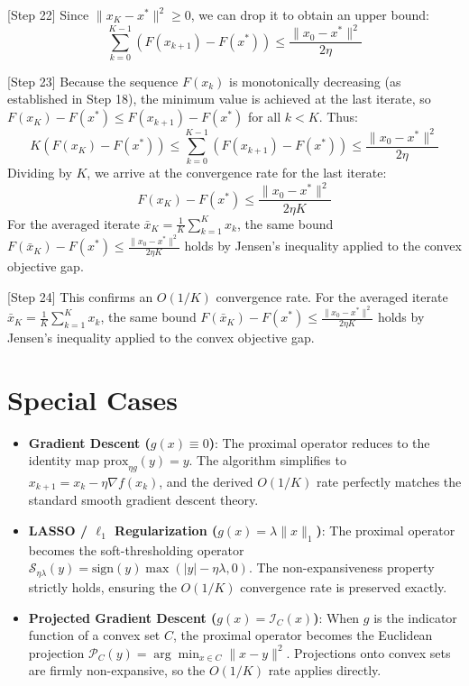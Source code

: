\documentclass{article}
\begin{document}
[Step 22] Since $\|x_K - x^*\|^2 \geq 0$, we can drop it to obtain an upper bound:
\begin{equation}
\sum_{k=0}^{K-1} \left( F(x_{k+1}) - F(x^*) \right) \leq \frac{\|x_0 - x^*\|^2}{2\eta}
\end{equation}

[Step 23] Because the sequence $F(x_k)$ is monotonically decreasing (as established in Step 18), the minimum value is achieved at the last iterate, so $F(x_K) - F(x^*) \leq F(x_{k+1}) - F(x^*)$ for all $k < K$. Thus:
\begin{equation}
K \left( F(x_K) - F(x^*) \right) \leq \sum_{k=0}^{K-1} \left( F(x_{k+1}) - F(x^*) \right) \leq \frac{\|x_0 - x^*\|^2}{2\eta}
\end{equation}
Dividing by $K$, we arrive at the convergence rate for the last iterate:
\begin{equation}
F(x_K) - F(x^*) \leq \frac{\|x_0 - x^*\|^2}{2 \eta K}
\end{equation}
For the averaged iterate $\bar{x}_K = \frac{1}{K}\sum_{k=1}^K x_k$, the same bound $F(\bar{x}_K) - F(x^*) \leq \frac{\|x_0 - x^*\|^2}{2 \eta K}$ holds by Jensen's inequality applied to the convex objective gap.

[Step 24] This confirms an $O(1/K)$ convergence rate. For the averaged iterate $\bar{x}_K = \frac{1}{K}\sum_{k=1}^K x_k$, the same bound $F(\bar{x}_K) - F(x^*) \leq \frac{\|x_0 - x^*\|^2}{2 \eta K}$ holds by Jensen's inequality applied to the convex objective gap.

\section*{Special Cases}
\begin{itemize}
\item \textbf{Gradient Descent ($g(x) \equiv 0$)}: The proximal operator reduces to the identity map $\text{prox}_{\eta g}(y) = y$. The algorithm simplifies to $x_{k+1} = x_k - \eta \nabla f(x_k)$, and the derived $O(1/K)$ rate perfectly matches the standard smooth gradient descent theory.
\item \textbf{LASSO / $\ell_1$ Regularization ($g(x) = \lambda \|x\|_1$)}: The proximal operator becomes the soft-thresholding operator $\mathcal{S}_{\eta \lambda}(y) = \text{sign}(y) \max(|y| - \eta \lambda, 0)$. The non-expansiveness property strictly holds, ensuring the $O(1/K)$ convergence rate is preserved exactly.
\item \textbf{Projected Gradient Descent ($g(x) = \mathcal{I}_C(x)$)}: When $g$ is the indicator function of a convex set $C$, the proximal operator becomes the Euclidean projection $\mathcal{P}_C(y) = \arg\min_{x \in C} \|x - y\|^2$. Projections onto convex sets are firmly non-expansive, so the $O(1/K)$ rate applies directly.
\end{itemize}
\end{document}
